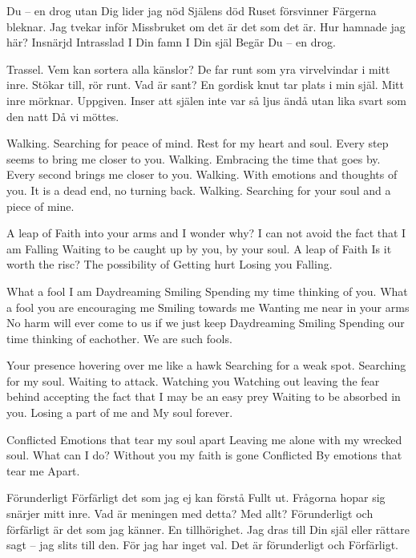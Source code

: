 \startpoem
Du – en drog
utan Dig 
lider jag nöd
Själens död
Ruset försvinner
Färgerna bleknar.
Jag tvekar inför  
Missbruket om det är det som 
det är.
Hur hamnade jag här?
Insnärjd
Intrasslad
I Din famn
I Din själ
Begär
Du – en drog.
\stoppoem

\startpoem
Trassel.
Vem kan sortera alla känslor?
De far runt som yra virvelvindar
i mitt inre.
Stökar till,
rör runt.
Vad är sant?
En gordisk knut tar plats i min själ.
Mitt inre mörknar.
Uppgiven.
Inser att själen inte var så ljus ändå
utan lika svart som den natt
Då vi möttes. 
\stoppoem

\startpoem
Walking.
Searching for peace of mind.
Rest for my heart and soul. 
Every step seems to bring me closer to you.
Walking.
Embracing the time that goes by.
Every second brings me closer to you.
Walking.
With emotions and thoughts of you.
It is a dead end, no turning back.
Walking.
Searching for your soul
and a piece of mine.
\stoppoem

\startpoem
A leap of Faith into
your arms and I wonder why?
I can not avoid the fact that I am
Falling
Waiting to be caught up by you,
by your soul.
A leap of Faith
Is it worth the risc?
The possibility of 
Getting hurt
Losing you
Falling.
\stoppoem

\startpoem
What a fool I am
Daydreaming
Smiling
Spending my time 
thinking of you.
What a fool you are
encouraging me
Smiling towards me
Wanting me near in your arms
No harm will ever come to us
if we just keep 
Daydreaming
Smiling
Spending our time
thinking of eachother.
We are such fools.
\stoppoem

\startpoem
Your presence 
hovering over me like a hawk
Searching for a weak spot.
Searching for my soul.
Waiting to attack.
Watching you
Watching out
leaving the fear behind
accepting the fact that I may be
an easy prey
Waiting to be absorbed in you.
Losing a part of me and
My soul forever.
\stoppoem

\startpoem
Conflicted
Emotions that tear
my soul apart
Leaving me alone
with my wrecked soul.
What can I do?
Without you
my faith is gone
Conflicted
By emotions
that tear me
Apart.
\stoppoem

\startpoem
Förunderligt
Förfärligt det som jag ej kan förstå
Fullt ut.
Frågorna hopar sig
snärjer mitt inre.
Vad är meningen med detta?
Med allt?
Förunderligt och
förfärligt är det som jag känner.
En tillhörighet.
Jag dras till Din själ eller rättare sagt –
jag slits till den.
För jag har inget val.
Det är förunderligt och
Förfärligt.
\stoppoem

